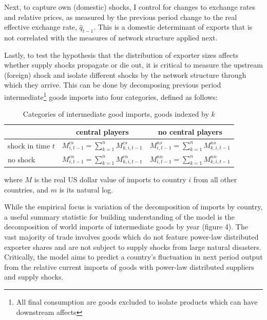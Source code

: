 \documentclass[10pt,letterpaper]{article}
\begin{document}
Next, to capture own (domestic) shocks, I control for changes to exchange rates and relative prices, as measured by the previous period change to the real effective exchange rate, $\hat{q}_{t-1}$. This is a domestic determinant of exports that is not correlated with the measures of network structure applied next.

Lastly, to test the hypothesis that the distribution of exporter sizes affects whether supply shocks propagate or die out, it is critical to measure the upstream (foreign) shock and isolate different shocks by the network structure through which they arrive. This can be done by decomposing previous period intermediate\footnote{All final consumption are goods excluded to isolate products which can have downstream affects} goods imports into four categories, defined as follows:

\begin{table}[h]\centering \caption{Categories of intermediate good imports, goods indexed by $k$ \label{mtab}}
	\begin{tabular}{l | c | c}
	\toprule
	 & central players & no central players \\
	 \midrule
	 shock in time $t$ & $M^{cs}_{i,t-1} = \sum_{k=1}^{n} M^{cs}_{k,i,t-1}$ & $M^{ns}_{i,t-1} = \sum_{k=1}^{n}M^{ns}_{k,i,t-1}$ \\
	 \midrule
	 no shock & $M^{cn}_{i,t-1} = \sum_{k=1}^{n} M^{cn}_{k,i,t-1}$ & $M^{nn}_{i,t-1} = \sum_{k=1}^{n}M^{nn}_{k,i,t-1}$ \\
	 \bottomrule
	\end{tabular}
	\end{table}
	
where $M$ is the real US dollar value of imports to country $i$ from all other countries, and $m$ is its natural log.

While the empirical focus is variation of the decomposition of imports by country, a useful summary statistic for building understanding of the model is the decomposition of world imports of intermediate goods by year (figure 4). The vast majority of trade involves goods which do not feature power-law distributed exporter shares and are not subject to supply shocks from large natural disasters. Critically, the model aims to predict a country's fluctuation in next period output from the relative current imports of goods with power-law distributed suppliers and supply shocks.
\end{document}
